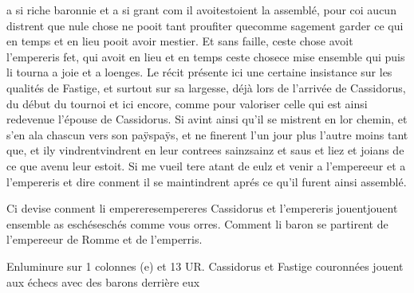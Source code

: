 \documentclass{article}
\begin{document}
\begin{pages}
   a si riche baronnie et a si grant com il 
   avoitestoient la assemblé, pour coi aucun distrent que 
   nule chose ne pooit tant proufiter quecomme 
      sagement garder ce qui en temps et en lieu pooit avoir mestier. 
   Et sans faille, ceste chose avoit l’empereris 
   fet, qui avoit en lieu et en temps ceste chosece mise ensemble 
   qui puis li tourna a joie et a loenges.
   Le récit présente ici une certaine insistance sur les qualités de Fastige, et surtout sur sa largesse, 
   déjà lors de l'arrivée de Cassidorus, du début du tournoi et ici encore, comme pour valoriser celle qui est ainsi redevenue 
   l'épouse de Cassidorus. Si avint ainsi qu’il se mistrent en lor chemin, et 
   s’en ala chascun vers son 
   paÿspaÿs, et ne finerent l'un jour plus l'autre moins tant que, 
   et ily 
   vindrentvindrent en leur contrees 
   sainzsainz et saus et liez et joians de ce que avenu leur estoit.
   Si me vueil tere atant de eulz et venir a l’empereeur et
   a l’empereris et dire conment il se maintindrent aprés ce qu’il furent ainsi assemblé. \pend
         
         
            
               Ci devise conment 
               li empereresempereres Cassidorus 
               et l’empereris jouentjouent ensemble 
               as eschéseschés comme vous orres.
               Comment li baron se partirent de l'empereeur de Romme et de l'emperris.
            
               Enluminure sur 1 colonnes (e) et 13 UR.
                  Cassidorus 
                  et Fastige 
                  couronnées jouent aux échecs avec des barons derrière eux 
               

\end{pages}
\end{document}
